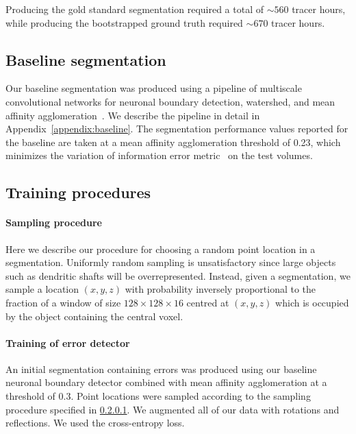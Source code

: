 \documentclass{article}
\begin{document}
Producing the gold standard segmentation required a total of $\sim 560$ tracer hours, while producing the bootstrapped ground truth required $\sim 670$ tracer hours.

\subsection{Baseline segmentation}
Our baseline segmentation was produced using a pipeline of multiscale convolutional networks for neuronal boundary detection, watershed, and mean affinity agglomeration~\cite{kisuk}. We describe the pipeline in detail in Appendix~\ref{appendix:baseline}. The segmentation performance values reported for the baseline are taken at a mean affinity agglomeration threshold of 0.23, which minimizes the variation of information error metric~\cite{meila2007,vi} on the test volumes.

\subsection{Training procedures}
\paragraph{Sampling procedure}
\label{sec:sampling}
Here we describe our procedure for choosing a random point location in a segmentation. Uniformly random sampling is unsatisfactory since large objects such as dendritic shafts will be overrepresented. Instead, given a segmentation, we sample a location $(x,y,z)$ with probability inversely proportional to the fraction of a window of size $128 \times 128 \times 16$ centred at $(x,y,z)$ which is occupied by the object containing the central voxel.

\paragraph{Training of error detector}
An initial segmentation containing errors was produced using our baseline neuronal boundary detector combined with mean affinity agglomeration at a threshold of 0.3. Point locations were sampled according to the sampling procedure specified in \ref{sec:sampling}. We augmented all of our data with rotations and reflections. We used the cross-entropy loss.
\end{document}
